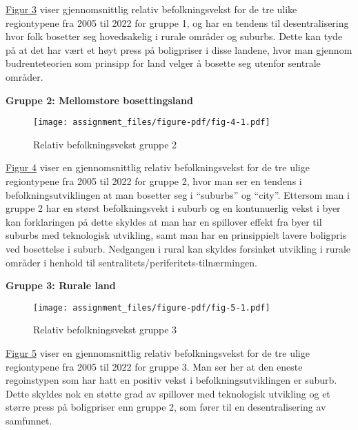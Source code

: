 \documentclass[
  letterpaper,
  DIV=11,
  numbers=noendperiod]{scrartcl}
\begin{document}
\protect\hyperlink{fig-3}{Figur 3} viser gjennomsnittlig relativ
befolkningsvekst for de tre ulike regiontypene fra 2005 til 2022 for
gruppe 1, og har en tendens til desentralisering hvor folk bosetter seg
hovedsakelig i rurale områder og suburbs. Dette kan tyde på at det har
vært et høyt press på boligpriser i disse landene, hvor man gjennom
budrenteteorien som prinsipp for land velger å bosette seg utenfor
sentrale områder.

\textbf{Gruppe 2: Mellomstore bosettingsland}

\begin{figure}

{\centering \texttt{[image: assignment\_files/figure-pdf/fig-4-1.pdf]}

}

\caption{\label{fig-4}Relativ befolkningsvekst gruppe 2}

\end{figure}

\protect\hyperlink{fig-4}{Figur 4} viser en gjennomsnittlig relativ
befolkningsvekst for de tre ulige regiontypene fra 2005 til 2022 for
gruppe 2, hvor man ser en tendens i befolkningsutviklingen at man
bosetter seg i ``suburbs'' og ``city''. Ettersom man i gruppe 2 har en
størst befolkningsvekt i suburb og en kontunuerlig vekst i byer kan
forklaringen på dette skyldes at man har en spillover effekt fra byer
til suburbs med teknologisk utvikling, samt man har en prinsippielt
lavere boligpris ved bosettelse i suburb. Nedgangen i rural kan skyldes
forsinket utvikling i rurale områder i henhold til
sentralitets/periferitets-tilnærmingen.

\textbf{Gruppe 3: Rurale land}

\begin{figure}

{\centering \texttt{[image: assignment\_files/figure-pdf/fig-5-1.pdf]}

}

\caption{\label{fig-5}Relativ befolkningsvekst gruppe 3}

\end{figure}

\protect\hyperlink{fig-5}{Figur 5} viser en gjennomsnittlig relativ
befolkningsvekst for de tre ulige regiontypene fra 2005 til 2022 for
gruppe 3. Man ser her at den eneste regoinstypen som har hatt en positiv
vekst i befolkningsutviklingen er suburb. Dette skyldes nok en støtte
grad av spillover med teknologisk utvikling og et større press på
boligpriser enn gruppe 2, som fører til en desentralisering av
samfunnet.
\end{document}
